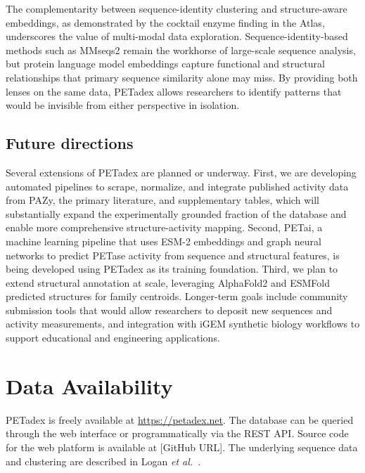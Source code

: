 \documentclass[unnumsec,webpdf,modern,large]{oup-authoring-template}
\begin{document}
The complementarity between sequence-identity clustering and structure-aware embeddings, as demonstrated by the cocktail enzyme finding in the Atlas, underscores the value of multi-modal data exploration. Sequence-identity-based methods such as MMseqs2 remain the workhorse of large-scale sequence analysis, but protein language model embeddings capture functional and structural relationships that primary sequence similarity alone may miss. By providing both lenses on the same data, PETadex allows researchers to identify patterns that would be invisible from either perspective in isolation.

\subsection{Future directions}

Several extensions of PETadex are planned or underway. First, we are developing automated pipelines to scrape, normalize, and integrate published activity data from PAZy, the primary literature, and supplementary tables, which will substantially expand the experimentally grounded fraction of the database and enable more comprehensive structure-activity mapping. Second, PETai, a machine learning pipeline that uses ESM-2 embeddings and graph neural networks to predict PETase activity from sequence and structural features, is being developed using PETadex as its training foundation. Third, we plan to extend structural annotation at scale, leveraging AlphaFold2 \citep{jumper_highly_2021} and ESMFold \citep{lin_evolutionary-scale_2023} predicted structures for family centroids. Longer-term goals include community submission tools that would allow researchers to deposit new sequences and activity measurements, and integration with iGEM synthetic biology workflows to support educational and engineering applications.

\section{Data Availability}

PETadex is freely available at \url{https://petadex.net}. The database can be queried through the web interface or programmatically via the REST API. Source code for the web platform is available at [GitHub URL]. The underlying sequence data and clustering are described in Logan \textit{et al.}\ \citep{chikhi_logan_2025}.

\end{document}
